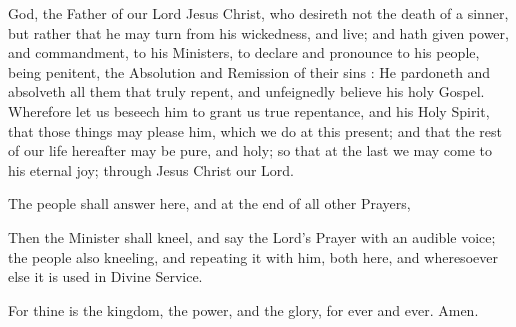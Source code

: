  God, the Father of our Lord Jesus Christ, who desireth not the death of a sinner, but rather that he may turn from his wickedness, and live; and hath given power, and commandment, to his Ministers, to declare and pronounce to his people, being penitent, the Absolution and Remission of their sins : He pardoneth and absolveth all them that truly repent, and unfeignedly believe his holy Gospel. Wherefore let us beseech him to grant us true repentance, and his Holy Spirit, that those things may please him, which we do at this present; and that the rest of our life hereafter may be pure, and holy; so that at the last we may come to his eternal joy; through Jesus Christ our Lord.

\begin{rubric}
The people shall answer here, and at the end of all other Prayers, 
\end{rubric}

\begin{rubric}
Then the Minister shall kneel, and say the Lord's Prayer with an audible voice; the people also kneeling, and repeating it with him, both here, and wheresoever else it is used in Divine Service.
\end{rubric}


For thine is the kingdom, the power, and the glory, for ever and ever.
Amen.
